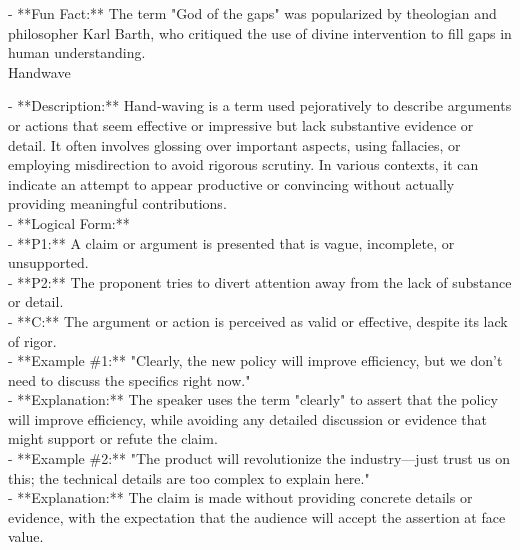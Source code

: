 \documentclass[a4paper,12pt,single,pdftex]{scrartcl}
\begin{document}
    
      - **Fun Fact:** The term "God of the gaps" was popularized by theologian and philosopher Karl Barth, who critiqued the use of divine intervention to fill gaps in human understanding.
    \\

  

Handwave
    
      - **Description:** Hand-waving is a term used pejoratively to describe arguments or actions that seem effective or impressive but lack substantive evidence or detail. It often involves glossing over important aspects, using fallacies, or employing misdirection to avoid rigorous scrutiny. In various contexts, it can indicate an attempt to appear productive or convincing without actually providing meaningful contributions.
    \\

    
      - **Logical Form:**
    \\

    
        - **P1:** A claim or argument is presented that is vague, incomplete, or unsupported.
    \\

    
        - **P2:** The proponent tries to divert attention away from the lack of substance or detail.
    \\

    
        - **C:** The argument or action is perceived as valid or effective, despite its lack of rigor.
    \\

    
      - **Example \#1:** "Clearly, the new policy will improve efficiency, but we don’t need to discuss the specifics right now."
    \\

    
      - **Explanation:** The speaker uses the term "clearly" to assert that the policy will improve efficiency, while avoiding any detailed discussion or evidence that might support or refute the claim.
    \\

    
      - **Example \#2:** "The product will revolutionize the industry—just trust us on this; the technical details are too complex to explain here."
    \\

    
      - **Explanation:** The claim is made without providing concrete details or evidence, with the expectation that the audience will accept the assertion at face value.
    \\
\end{document}
